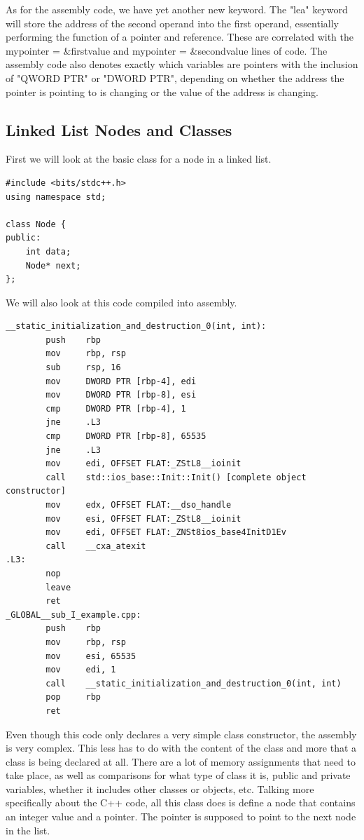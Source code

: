 \documentclass{article}
\theoremstyle{theorem}
\theoremstyle{definition}
\theoremstyle{remark}
\begin{document}
As for the assembly code, we have yet another new keyword. The "lea" keyword will store the address of the second operand into the first operand, essentially performing the function of a pointer and reference. These are correlated with the mypointer = \&firstvalue and mypointer = \&secondvalue lines of code. The assembly code also denotes exactly which variables are pointers with the inclusion of "QWORD PTR" or "DWORD PTR", depending on whether the address the pointer is pointing to is changing or the value of the address is changing.

\subsection{Linked List Nodes and Classes}

First we will look at the basic class for a node in a linked list.

\begin{lstlisting}
#include <bits/stdc++.h>
using namespace std;
  
class Node {
public:
    int data;
    Node* next;
};
\end{lstlisting}

We will also look at this code compiled into assembly.

\begin{lstlisting}
__static_initialization_and_destruction_0(int, int):
        push    rbp
        mov     rbp, rsp
        sub     rsp, 16
        mov     DWORD PTR [rbp-4], edi
        mov     DWORD PTR [rbp-8], esi
        cmp     DWORD PTR [rbp-4], 1
        jne     .L3
        cmp     DWORD PTR [rbp-8], 65535
        jne     .L3
        mov     edi, OFFSET FLAT:_ZStL8__ioinit
        call    std::ios_base::Init::Init() [complete object constructor]
        mov     edx, OFFSET FLAT:__dso_handle
        mov     esi, OFFSET FLAT:_ZStL8__ioinit
        mov     edi, OFFSET FLAT:_ZNSt8ios_base4InitD1Ev
        call    __cxa_atexit
.L3:
        nop
        leave
        ret
_GLOBAL__sub_I_example.cpp:
        push    rbp
        mov     rbp, rsp
        mov     esi, 65535
        mov     edi, 1
        call    __static_initialization_and_destruction_0(int, int)
        pop     rbp
        ret
\end{lstlisting}

Even though this code only declares a very simple class constructor, the assembly is very complex. This less has to do with the content of the class and more that a class is being declared at all. There are a lot of memory assignments that need to take place, as well as comparisons for what type of class it is, public and private variables, whether it includes other classes or objects, etc. Talking more specifically about the C++ code, all this class does is define a node that contains an integer value and a pointer. The pointer is supposed to point to the next node in the list.
\end{document}
